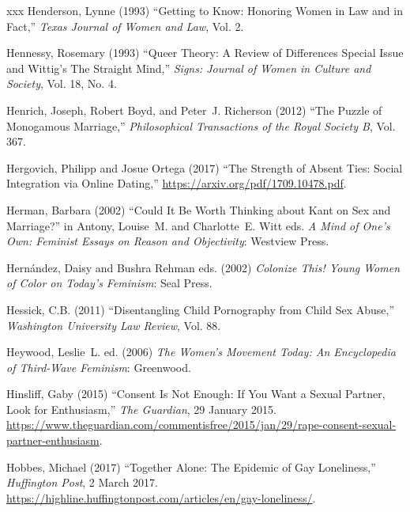\documentclass[]{jlreq} \usepackage{mystyle}
\begin{document}
\begin{thebibliography}{xxx}
Henderson, Lynne (1993) ``Getting to Know: Honoring Women in Law and in Fact,''
  \textit{ Texas Journal of Women and Law}, Vol. 2.

Hennessy, Rosemary (1993) ``Queer Theory: A Review of Differences Special Issue
  and Wittig's The Straight Mind,'' \textit{ Signs: Journal of Women in Culture
  and Society}, Vol. 18, No. 4.

Henrich, Joseph, Robert Boyd, and Peter~J. Richerson (2012) ``The Puzzle of
  Monogamous Marriage,'' \textit{ Philosophical Transactions of the Royal
  Society B}, Vol. 367.

Hergovich, Philipp and Josue Ortega (2017) ``The Strength of Absent Ties:
  Social Integration via Online Dating,''
  \url{https://arxiv.org/pdf/1709.10478.pdf}.

Herman, Barbara (2002) ``Could It Be Worth Thinking about Kant on Sex and
  Marriage?'' in Antony, Louise~M. and Charlotte~E. Witt eds.   \textit{ A Mind
  of One's Own: Feminist Essays on Reason and Objectivity}: Westview Press.

Hernández, Daisy and Bushra Rehman eds.  (2002)  \textit{ Colonize This! Young
  Women of Color on Today's Feminism}: Seal Press.

Hessick, C.B. (2011) ``Disentangling Child Pornography from Child Sex Abuse,''
  \textit{ Washington University Law Review}, Vol. 88.

Heywood, Leslie~L. ed.  (2006)  \textit{ The Women's Movement Today: An
  Encyclopedia of Third-Wave Feminism}: Greenwood.

Hinsliff, Gaby (2015) ``Consent Is Not Enough: If You Want a Sexual Partner,
  Look for Enthusiasm,'' \emph{The Guardian}, 29 January 2015.
  \url{https://www.theguardian.com/commentisfree/2015/jan/29/rape-consent-sexual-partner-enthusiasm}.

Hobbes, Michael (2017) ``Together Alone: The Epidemic of Gay Loneliness,''
  \emph{Huffington Post}, 2 March 2017.
  \url{https://highline.huffingtonpost.com/articles/en/gay-loneliness/}.


\end{thebibliography}
\end{document}
